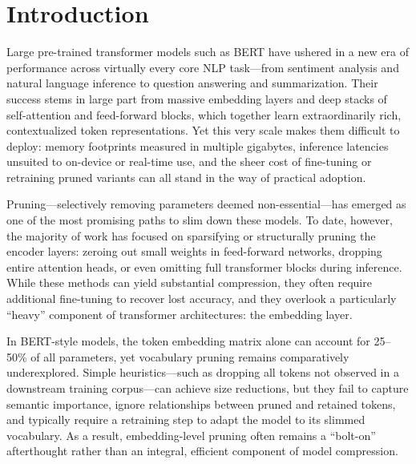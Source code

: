 \documentclass[twocolumn]{article}
\begin{document}


\section{Introduction}

Large pre-trained transformer models such as BERT have ushered in a new era of performance across virtually every core NLP task---from sentiment analysis and natural language inference to question answering and summarization. Their success stems in large part from massive embedding layers and deep stacks of self-attention and feed-forward blocks, which together learn extraordinarily rich, contextualized token representations. Yet this very scale makes them difficult to deploy: memory footprints measured in multiple gigabytes, inference latencies unsuited to on-device or real-time use, and the sheer cost of fine-tuning or retraining pruned variants can all stand in the way of practical adoption.

Pruning---selectively removing parameters deemed non-essential---has emerged as one of the most promising paths to slim down these models. To date, however, the majority of work has focused on sparsifying or structurally pruning the encoder layers: zeroing out small weights in feed-forward networks, dropping entire attention heads, or even omitting full transformer blocks during inference. While these methods can yield substantial compression, they often require additional fine-tuning to recover lost accuracy, and they overlook a particularly ``heavy'' component of transformer architectures: the embedding layer.

In BERT-style models, the token embedding matrix alone can account for 25--50\% of all parameters, yet vocabulary pruning remains comparatively underexplored. Simple heuristics---such as dropping all tokens not observed in a downstream training corpus---can achieve size reductions, but they fail to capture semantic importance, ignore relationships between pruned and retained tokens, and typically require a retraining step to adapt the model to its slimmed vocabulary. As a result, embedding-level pruning often remains a ``bolt-on'' afterthought rather than an integral, efficient component of model compression.
\end{document}
